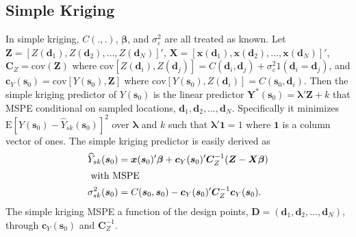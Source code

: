 \documentclass[12pt]{article}
\begin{document}
\subsection{Simple Kriging}
In simple kriging, $C(.,.)$, $\bm{\beta}$, and $\sigma^2_{\varepsilon}$ are all treated as known. Let $\bm{Z} = [Z(\bm{d}_1), Z(\bm{d}_2), \dots, Z(\bm{d}_N) ]'$, $\bm{X} = [\bm{x}(\bm{d}_1), \bm{x}(\bm{d}_2), \dots, \bm{x}(\bm{d}_N)]'$, $\bm{C}_Z = \mathrm{cov}(\bm{Z})$ where $\mathrm{cov}[Z(\bm{d}_i), Z(\bm{d}_j)] = C(\bm{d}_i,\bm{d}_j) + \sigma^2_\varepsilon 1(\bm{d}_i = \bm{d}_j)$, and $\bm{c}_Y(\bm{s}_0) = \mathrm{cov}[Y(\bm{s}_0), \bm{Z}]$ where $\mathrm{cov}[Y(\bm{s}_0), Z(\bm{d}_i)] = C(\bm{s}_0, \bm{d}_i)$. Then the simple kriging predictor of $Y(\bm{s}_0)$ is the linear predictor $\bm{Y}^*(\bm{s}_0) = \bm{\lambda}'\bm{Z} + k$ that MSPE conditional on sampled locations, $\bm{d}_1, \bm{d}_2, \dots, \bm{d}_N$. Specifically it minimizes $\mathrm{E}[Y(\bm{s}_0) - \widehat{Y}_{sk}(\bm{s}_0)]^2$ over $\bm{\lambda}$ and $k$ such that $\bm{\lambda}'\bm{1}=1$ where $\bm{1}$ is a column vector of ones. The simple kriging predictor is easily derived as 
\begin{align*}
\widehat{Y}_{sk}(\bm{s}_0) &= \bm{x}(\bm{s}_0)'\bm{\beta} + \bm{c}_Y(\bm{s}_0)'\bm{C}_Z^{-1}(\bm{Z} - \bm{X}\bm{\beta})\\
\intertext{ with MSPE }
\sigma_{sk}^{2}(\bm{s}_0) &= C(\bm{s}_0,\bm{s}_0) - \bm{c}_Y(\bm{s}_0)'\bm{C}_Z^{-1}\bm{c}_Y(\bm{s}_0).
\end{align*}
The simple kriging MSPE a function of the design points, $\bm{D}=(\bm{d}_1,\bm{d}_2,\dots,\bm{d}_N)$, through $\bm{c}_Y(\bm{s}_0)$ and $\bm{C}_Z^{-1}$. 
\end{document}
